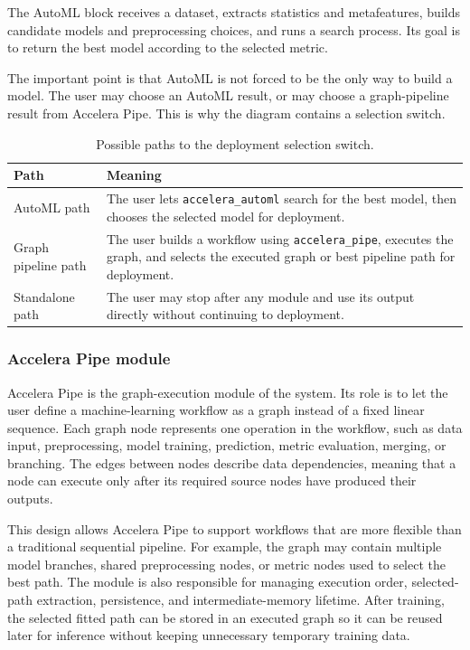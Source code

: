 \documentclass[12pt,a4paper]{report}
\newcommand{\acceleraTableStyle}{%
\small
\renewcommand{\arraystretch}{1.15}
\setlength{\tabcolsep}{4pt}%
}
\begin{document}
The AutoML block receives a dataset, extracts statistics and metafeatures, builds
candidate models and preprocessing choices, and runs a search process. Its goal
is to return the best model according to the selected metric.

The important point is that AutoML is not forced to be the only way to build a
model. The user may choose an AutoML result, or may choose a graph-pipeline
result from Accelera Pipe. This is why the diagram contains a selection switch.

\begin{table}[!htbp]
\centering
\acceleraTableStyle
\caption{Possible paths to the deployment selection switch.}
\label{tab:selection-switch-paths}
\begin{tabularx}{\textwidth}{p{}X}
\toprule
\textbf{Path} & \textbf{Meaning} \\
\midrule

AutoML path &
The user lets \texttt{accelera\_automl} search for the best model, then chooses
the selected model for deployment. \\
\midrule

Graph pipeline path &
The user builds a workflow using \texttt{accelera\_pipe}, executes the graph,
and selects the executed graph or best pipeline path for deployment. \\
\midrule

Standalone path &
The user may stop after any module and use its output directly without
continuing to deployment. \\

\bottomrule
\end{tabularx}
\end{table}

\subsubsection*{Accelera Pipe module}

Accelera Pipe is the graph-execution module of the system. Its role is to let the
user define a machine-learning workflow as a graph instead of a fixed linear
sequence. Each graph node represents one operation in the workflow, such as data
input, preprocessing, model training, prediction, metric evaluation, merging, or
branching. The edges between nodes describe data dependencies, meaning that a
node can execute only after its required source nodes have produced their
outputs.

This design allows Accelera Pipe to support workflows that are more flexible
than a traditional sequential pipeline. For example, the graph may contain
multiple model branches, shared preprocessing nodes, or metric nodes used to
select the best path. The module is also responsible for managing execution
order, selected-path extraction, persistence, and intermediate-memory lifetime.
After training, the selected fitted path can be stored in an executed graph so it
can be reused later for inference without keeping unnecessary temporary training
data.
\end{document}
